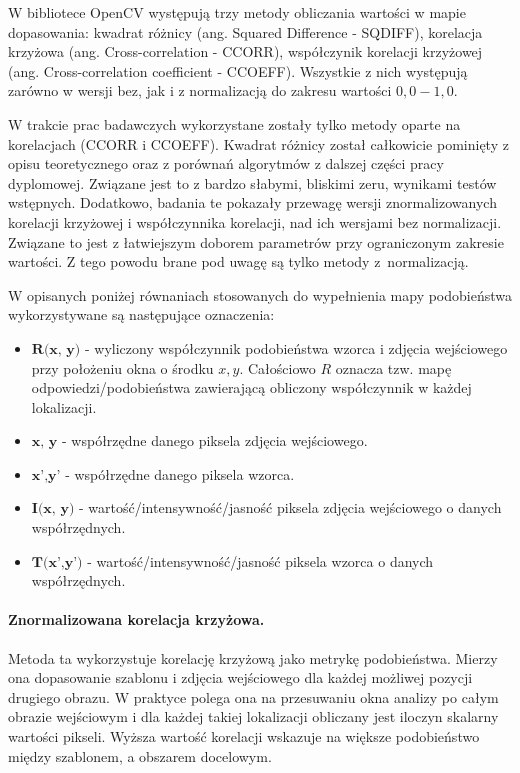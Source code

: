 W bibliotece OpenCV występują trzy metody obliczania wartości w mapie dopasowania: kwadrat różnicy (ang. Squared Difference - SQDIFF), korelacja krzyżowa (ang. Cross-correlation - CCORR), współczynik korelacji krzyżowej (ang. Cross-correlation coefficient - CCOEFF). Wszystkie z nich występują zarówno w wersji bez, jak i z normalizacją \cite{template_opencv_1}\cite{template_opencv_2} do zakresu wartości $0,0-1,0$. 

W trakcie prac badawczych wykorzystane zostały tylko metody oparte na korelacjach (CCORR i CCOEFF). Kwadrat różnicy został całkowicie pominięty z opisu teoretycznego oraz z porównań algorytmów z dalszej części pracy dyplomowej. Związane jest to z bardzo słabymi, bliskimi zeru, wynikami testów wstępnych. Dodatkowo, badania te pokazały przewagę wersji znormalizowanych korelacji krzyżowej i współczynnika korelacji, nad ich wersjami bez normalizacji. Związane to jest z łatwiejszym doborem parametrów przy ograniczonym zakresie wartości. Z tego powodu brane pod uwagę są tylko metody z~normalizacją. 

W opisanych poniżej równaniach stosowanych do wypełnienia mapy podobieństwa wykorzystywane są następujące oznaczenia:

\begin{itemize}
    \item $\textbf{R(x, y)}$ - wyliczony współczynnik podobieństwa wzorca i zdjęcia wejściowego przy położeniu okna  o środku $x, y$. Całościowo $R$ oznacza tzw. mapę odpowiedzi/podobieństwa zawierającą obliczony współczynnik w każdej lokalizacji.
    \item $\textbf{x, y}$ - współrzędne danego piksela zdjęcia wejściowego.
    \item $\textbf{x',y'}$ - współrzędne danego piksela wzorca.
    \item $\textbf{I(x, y)}$ - wartość/intensywność/jasność piksela zdjęcia wejściowego o danych współrzędnych.
    \item $\textbf{T(x',y')}$ - wartość/intensywność/jasność piksela wzorca o danych współrzędnych.
\end{itemize}



\paragraph{Znormalizowana korelacja krzyżowa.}
Metoda ta wykorzystuje korelację krzyżową jako metrykę podobieństwa. Mierzy ona dopasowanie szablonu i zdjęcia wejściowego dla każdej możliwej pozycji drugiego obrazu. W praktyce polega ona na przesuwaniu okna analizy po całym obrazie wejściowym i dla każdej takiej lokalizacji obliczany jest iloczyn skalarny wartości pikseli. Wyższa wartość korelacji wskazuje na większe podobieństwo między szablonem, a obszarem docelowym.

